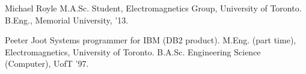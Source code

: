 \documentclass[12pt,journal,compsoc]{../ieeepaper/IEEEtran}
\begin{document}

\label{app:bibliography}


% 


\begin{IEEEbiography}{Michael Royle}
M.A.Sc. Student, Electromagnetics Group, University of Toronto. B.Eng., Memorial University, '13. 
\end{IEEEbiography}

\begin{IEEEbiography}{Peeter Joot}
Systems programmer for IBM (DB2 product).  M.Eng. (part time), Electromagnetics, University of Toronto. B.A.Sc. Engineering Science (Computer), UofT '97. 
\end{IEEEbiography}






\end{document}
